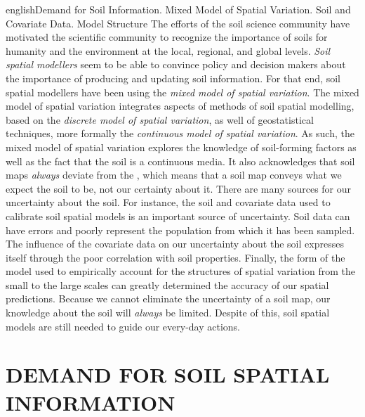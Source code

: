 \def\enkeys{Demand for Soil Information. Mixed Model of Spatial Variation. Soil and Covariate Data. Model 
Structure}
\begin{chapterabstract}{english}{\enkeys}
The efforts of the soil science community have motivated the scientific community to recognize the importance 
of soils for humanity and the environment at the local, regional, and global levels. \emph{Soil spatial 
modellers} seem to be able to convince policy and decision makers about the importance of producing and 
updating soil information. For that end, soil spatial modellers have been using the \emph{mixed model of 
spatial variation}. The mixed model of spatial variation integrates aspects of  methods of soil 
spatial modelling, based on the \emph{discrete model of spatial variation}, as well of geostatistical 
techniques, more formally the \emph{continuous model of spatial variation}. As such, the mixed model of 
spatial variation explores the knowledge of soil-forming factors as well as the fact that the soil is a 
continuous media. It also acknowledges that soil maps \emph{always} deviate from the , which means 
that a soil map conveys what we expect the soil to be, not our certainty about it. There are many sources for 
our uncertainty about the soil. For instance, the soil and covariate data used to calibrate soil spatial 
models is an important source of uncertainty. Soil data can have errors and poorly represent the population 
from which it has been sampled. The influence of the covariate data on our uncertainty about the soil 
expresses itself through the poor correlation with soil properties. Finally, the form of the model used to 
empirically account for the structures of spatial variation from the small to the large scales can greatly 
determined the accuracy of our spatial predictions. Because we cannot eliminate the uncertainty of a soil map, 
our knowledge about the soil will \emph{always} be limited. Despite of this, soil spatial models are still 
needed to guide our every-day actions.
\end{chapterabstract}

\formatchapter

\section{DEMAND FOR SOIL SPATIAL INFORMATION}

